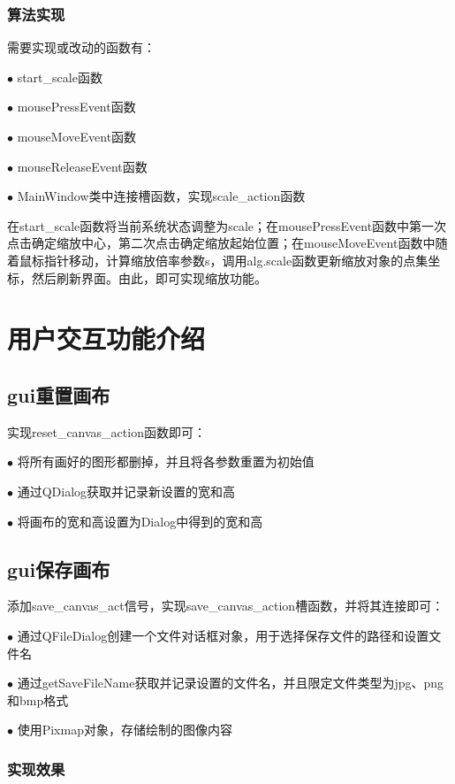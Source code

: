 \documentclass[a4paper,UTF8]{article}
\theoremstyle{definition}
\begin{document}
\subsubsection{算法实现}

需要实现或改动的函数有：

$\bullet$ start\_scale函数

$\bullet$ mousePressEvent函数

$\bullet$ mouseMoveEvent函数

$\bullet$ mouseReleaseEvent函数

$\bullet$ MainWindow类中连接槽函数，实现scale\_action函数

在start\_scale函数将当前系统状态调整为scale；在mousePressEvent函数中第一次点击确定缩放中心，第二次点击确定缩放起始位置；在mouseMoveEvent函数中随着鼠标指针移动，计算缩放倍率参数s，调用alg.scale函数更新缩放对象的点集坐标，然后刷新界面。由此，即可实现缩放功能。

\section{用户交互功能介绍}

\subsection{gui重置画布}

实现reset\_canvas\_action函数即可：

$\bullet$ 将所有画好的图形都删掉，并且将各参数重置为初始值

$\bullet$ 通过QDialog获取并记录新设置的宽和高

$\bullet$ 将画布的宽和高设置为Dialog中得到的宽和高

\subsection{gui保存画布}

添加save\_canvas\_act信号，实现save\_canvas\_action槽函数，并将其连接即可：

$\bullet$ 通过QFileDialog创建一个文件对话框对象，用于选择保存文件的路径和设置文件名

$\bullet$ 通过getSaveFileName获取并记录设置的文件名，并且限定文件类型为jpg、png和bmp格式

$\bullet$ 使用Pixmap对象，存储绘制的图像内容

\subsubsection{实现效果}
\end{document}

